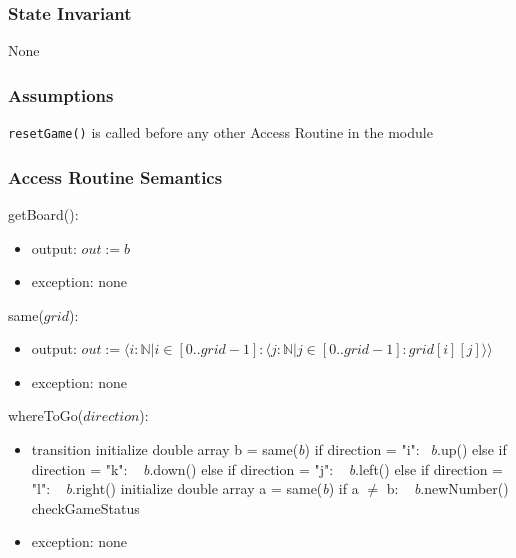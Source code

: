\documentclass[12pt]{article}
\begin{document}
\subsubsection* {State Invariant}

None

\subsubsection* {Assumptions}

\verb|resetGame()| is called before any other Access Routine in the module

\subsubsection* {Access Routine Semantics}

\noindent getBoard():
\begin{itemize}
\item output: $out := b$ 
\item exception: none
\end{itemize}

\noindent same($grid$):
\begin{itemize}
\item output: $out := \langle i : \mathbb{N} | i \in [0..grid-1]: \langle j  : \mathbb{N} | j \in [0..grid-1]: grid[i][j] \rangle\rangle$
\item exception: none
\end{itemize}

\noindent whereToGo($direction$):
\begin{itemize}
\item transition \newline
      initialize double array b = \mbox{same(\textit{b})} \newline
      if direction = "i": \newline
      $~~$\textit{b}.\mbox{up()} \newline
      else if direction = "k": \newline
      $~~$  \textit{b}.\mbox{down()} \newline
      else if direction = "j": \newline
      $~~$ \textit{b}.\mbox{left()} \newline
      else if direction = "l": \newline
      $~~$ \textit{b}.\mbox{right()} \newline
      initialize double array a = \mbox{same(\textit{b})} \newline
      if a $\neq$ b: \newline
      $~~$  \textit{b}.\mbox{newNumber()} \newline
      \mbox{checkGameStatus} \newline
\item exception: none
\end{itemize}
\end{document}
